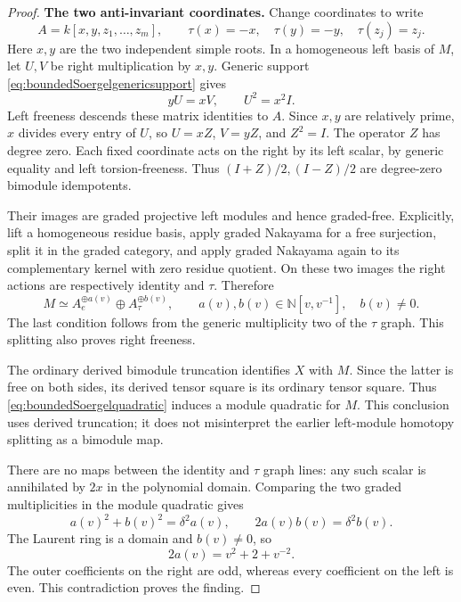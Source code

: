 \begin{proof}
\par\smallskip\noindent\textbf{The two anti-invariant coordinates.}\quad
Change coordinates to write
\[
 A=k[x,y,z_1,\ldots,z_m],\qquad
 \tau(x)=-x,\quad\tau(y)=-y,\quad\tau(z_j)=z_j.
\]
Here \(x,y\) are the two independent simple roots. In a
homogeneous left basis of \(M\), let \(U,V\) be right
multiplication by \(x,y\). Generic support
\eqref{eq:boundedSoergelgenericsupport} gives
\[
                       yU=xV,\qquad U^2=x^2I.
\]
Left freeness descends these matrix identities to \(A\).
Since \(x,y\) are relatively prime, \(x\) divides every
entry of \(U\), so \(U=xZ\), \(V=yZ\), and \(Z^2=I\).
The operator \(Z\) has degree zero. Each fixed coordinate
acts on the right by its left scalar, by generic equality
and left torsion-freeness. Thus
\((I+Z)/2,(I-Z)/2\) are degree-zero bimodule idempotents.

Their images are graded projective left modules and hence
graded-free. Explicitly, lift a homogeneous residue basis,
apply graded Nakayama for a free surjection, split it in the
graded category, and apply graded Nakayama again to its
complementary kernel with zero residue quotient. On these
two images the right actions are respectively identity and
\(\tau\). Therefore
\begin{equation}\label{eq:boundedSoergelgraphsplit}
 M\simeq A_e^{\oplus a(v)}\oplus A_\tau^{\oplus b(v)},
 \qquad a(v),b(v)\in\mathbb N[v,v^{-1}],\quad b(v)\ne0.
\end{equation}
The last condition follows from the generic multiplicity
two of the \(\tau\) graph. This splitting also proves
right freeness.

The ordinary derived bimodule truncation identifies \(X\)
with \(M\). Since the latter is free on both sides, its
derived tensor square is its ordinary tensor square.
Thus \eqref{eq:boundedSoergelquadratic} induces a module
quadratic for \(M\). This conclusion uses derived
truncation; it does not misinterpret the earlier
left-module homotopy splitting as a bimodule map.

There are no maps between the identity and \(\tau\)
graph lines: any such scalar is annihilated by \(2x\)
in the polynomial domain. Comparing the two graded
multiplicities in the module quadratic gives
\[
 a(v)^2+b(v)^2=\delta^2a(v),\qquad
 2a(v)b(v)=\delta^2b(v).
\]
The Laurent ring is a domain and \(b(v)\ne0\), so
\[
                       2a(v)=v^2+2+v^{-2}.
\]
The outer coefficients on the right are odd, whereas
every coefficient on the left is even. This contradiction
proves the finding.
\end{proof}

